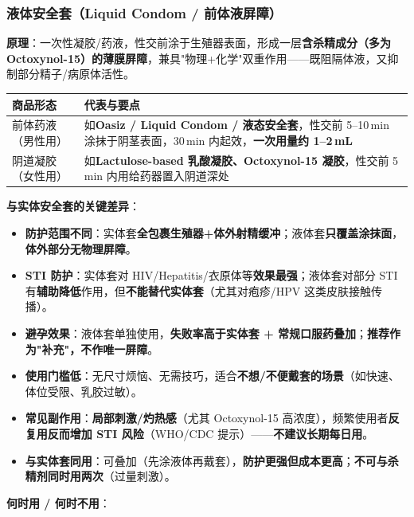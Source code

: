 \documentclass[12pt,UTF8,openany]{ctexbook}
\begin{document}
\subsubsection*{液体安全套（Liquid Condom / 前体液屏障）}

\textbf{原理}：一次性凝胶/药液，性交前涂于生殖器表面，形成一层\textbf{含杀精成分（多为 Octoxynol-15）的薄膜屏障}，兼具"物理+化学"双重作用——既阻隔体液，又抑制部分精子/病原体活性。

\begin{center}
\footnotesize
\begin{tabularx}{\textwidth}{lX}
\toprule
\textbf{商品形态} & \textbf{代表与要点} \\
\midrule
前体药液（男性用） & 如\textbf{Oasiz / Liquid Condom / 液态安全套}，性交前 5--10\,min 涂抹于阴茎表面，30\,min 内起效，\textbf{一次用量约 1--2\,mL} \\
阴道凝胶（女性用） & 如\textbf{Lactulose-based 乳酸凝胶、Octoxynol-15 凝胶}，性交前 5\,min 内用给药器置入阴道深处 \\
\bottomrule
\end{tabularx}
\end{center}

\noindent \textbf{与实体安全套的关键差异}：

\begin{itemize}[leftmargin=2em,itemsep=0.3em]
  \item \textbf{防护范围不同}：实体套\textbf{全包裹生殖器+体外射精缓冲}；液体套\textbf{只覆盖涂抹面}，\textbf{体外部分无物理屏障}。
  \item \textbf{STI 防护}：实体套对 HIV/Hepatitis/衣原体等\textbf{效果最强}；液体套对部分 STI 有\textbf{辅助降低}作用，但\textbf{不能替代实体套}（尤其对疱疹/HPV 这类皮肤接触传播）。
  \item \textbf{避孕效果}：液体套单独使用，\textbf{失败率高于实体套 + 常规口服药叠加}；\textbf{推荐作为"补充"，不作唯一屏障}。
  \item \textbf{使用门槛低}：无尺寸烦恼、无需技巧，适合\textbf{不想/不便戴套的场景}（如快速、体位受限、乳胶过敏）。
  \item \textbf{常见副作用}：\textbf{局部刺激/灼热感}（尤其 Octoxynol-15 高浓度），频繁使用者\textbf{反复用反而增加 STI 风险}（WHO/CDC 提示）——\textbf{不建议长期每日用}。
  \item \textbf{与实体套同用}：可叠加（先涂液体再戴套），\textbf{防护更强但成本更高}；\textbf{不可与杀精剂同时用两次}（过量刺激）。
\end{itemize}

\noindent \textbf{何时用 / 何时不用}：
\end{document}
